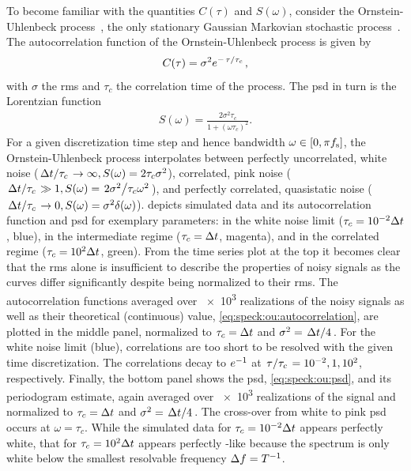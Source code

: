 To become familiar with the quantities $C(\tau)$ and $S(\omega)$, consider the Ornstein-Uhlenbeck process~\cite{Uhlenbeck1930}, the only stationary Gaussian Markovian stochastic process~\cite{VanKampen1976}.
The autocorrelation function of the Ornstein-Uhlenbeck process is given by
\begin{align}\label{eq:speck:ou:autocorrelation}
    C(\tau) = \sigma^2\e^{-\flatfrac{\tau}{\tau_c}},
\end{align}
with $\sigma$ the \gls{rms} and $\tau_c$ the correlation time of the process.
The \gls{psd} in turn is the Lorentzian function
\begin{align}\label{eq:speck:ou:psd}
    S(\omega) = \frac{2\sigma^2\tau_c}{1 + (\omega\tau_c)^2}.
\end{align}
For a given discretization time step \dt and hence bandwidth $\omega\in [0, \pi f_{\mathrm{s}}]$, the Ornstein-Uhlenbeck process interpolates between perfectly uncorrelated, white noise ($\flatfrac{\dt}{\tau_c}\to\infty, S(\omega) = 2\tau_c\sigma^2$), correlated, pink noise ($\flatfrac{\dt}{\tau_c}\gg 1, S(\omega) = \flatfrac{2\sigma^2}{\tau_c\omega^2}$), and perfectly correlated, quasistatic noise ($\flatfrac{\dt}{\tau_c}\to 0, S(\omega) = \sigma^2\delta(\omega)$).
 depicts simulated data and its autocorrelation function and \gls{psd} for exemplary parameters: in the white noise limit ($\tau_c = \num{e-2}\Delta t$, blue), in the intermediate regime ($\tau_c = \Delta t$, magenta), and in the correlated regime ($\tau_c = \num{e+2}\Delta t$, green).
From the time series plot at the top it becomes clear that the \gls{rms} alone is insufficient to describe the properties of noisy signals as the curves differ significantly despite being normalized to their \gls{rms}.
The autocorrelation functions averaged over \num{e3} realizations of the noisy signals as well as their theoretical (continuous) value, \cref{eq:speck:ou:autocorrelation}, are plotted in the middle panel, normalized to $\tau_c=\Delta t$ and $\sigma^2=\flatfrac{\dt}{4}$.
For the white noise limit (blue), correlations are too short to be resolved with the given time discretization.
The correlations decay to $e^{-1}$ at $\flatfrac{\tau}{\tau_c}=\num{e-2},\num{e0},\num{e+2}$, respectively.
Finally, the bottom panel shows the \gls{psd}, \cref{eq:speck:ou:psd}, and its periodogram estimate, again averaged over \num{e3} realizations of the signal and normalized to $\tau_c=\Delta t$ and $\sigma^2=\flatfrac{\dt}{4}$.
The cross-over from white to pink \gls{psd} occurs at $\omega = \tau_c$.
While the simulated data for $\tau_c = \num{e-2}\Delta t$ appears perfectly white, that for $\tau_c = \num{e2}\Delta t$ appears perfectly \oneoverf-like because the spectrum is only white below the smallest resolvable frequency $\Delta f = T^{-1}$.

